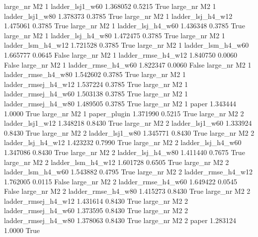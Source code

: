   large_nr       M2                 1     ladder_lsj1_w60   1.368052      0.5215    True
  large_nr       M2                 1     ladder_lsj1_w80   1.378373      0.3785    True
  large_nr       M2                 1   ladder_lsj_h4_w12   1.475061      0.3785    True
  large_nr       M2                 1   ladder_lsj_h4_w60   1.436348      0.3785    True
  large_nr       M2                 1   ladder_lsj_h4_w80   1.472475      0.3785    True
  large_nr       M2                 1   ladder_lsm_h4_w12   1.721528      0.3785    True
  large_nr       M2                 1   ladder_lsm_h4_w60   1.665777      0.0645   False
  large_nr       M2                 1  ladder_rmse_h4_w12   1.840750      0.0060   False
  large_nr       M2                 1  ladder_rmse_h4_w60   1.822347      0.0060   False
  large_nr       M2                 1  ladder_rmse_h4_w80   1.542602      0.3785    True
  large_nr       M2                 1 ladder_rmsej_h4_w12   1.537224      0.3785    True
  large_nr       M2                 1 ladder_rmsej_h4_w60   1.503138      0.3785    True
  large_nr       M2                 1 ladder_rmsej_h4_w80   1.489505      0.3785    True
  large_nr       M2                 1               paper   1.343444      1.0000    True
  large_nr       M2                 1        paper_plugin   1.371990      0.5215    True
  large_nr       M2                 2     ladder_lsj1_w12   1.348218      0.8430    True
  large_nr       M2                 2     ladder_lsj1_w60   1.333924      0.8430    True
  large_nr       M2                 2     ladder_lsj1_w80   1.345771      0.8430    True
  large_nr       M2                 2   ladder_lsj_h4_w12   1.423232      0.7990    True
  large_nr       M2                 2   ladder_lsj_h4_w60   1.347086      0.8430    True
  large_nr       M2                 2   ladder_lsj_h4_w80   1.411440      0.7675    True
  large_nr       M2                 2   ladder_lsm_h4_w12   1.601728      0.6505    True
  large_nr       M2                 2   ladder_lsm_h4_w60   1.543882      0.4795    True
  large_nr       M2                 2  ladder_rmse_h4_w12   1.762005      0.0115   False
  large_nr       M2                 2  ladder_rmse_h4_w60   1.649422      0.0545   False
  large_nr       M2                 2  ladder_rmse_h4_w80   1.415273      0.8430    True
  large_nr       M2                 2 ladder_rmsej_h4_w12   1.431614      0.8430    True
  large_nr       M2                 2 ladder_rmsej_h4_w60   1.373595      0.8430    True
  large_nr       M2                 2 ladder_rmsej_h4_w80   1.378063      0.8430    True
  large_nr       M2                 2               paper   1.283124      1.0000    True
